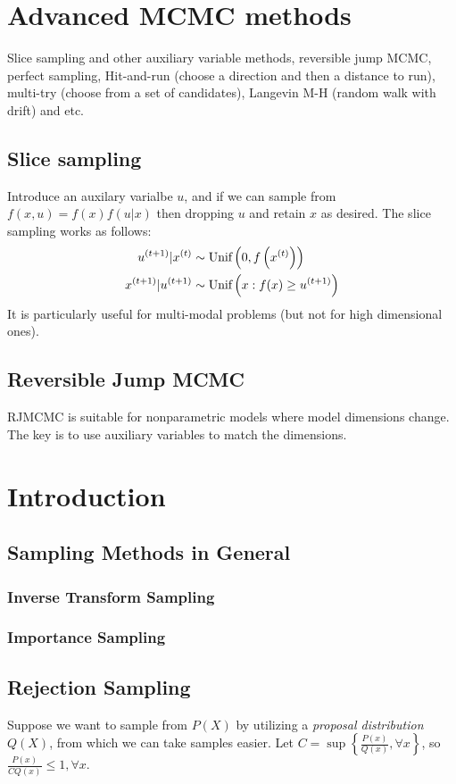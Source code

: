 \section{Advanced MCMC methods}
Slice sampling and other auxiliary variable methods, reversible jump MCMC, perfect sampling, Hit-and-run (choose a direction and then a distance to run), multi-try (choose from a set of candidates), Langevin M-H (random walk with drift) and etc.

\subsection{Slice sampling}
Introduce an auxilary varialbe $u$, and if we can sample from $f(x,u) = f(x)f(u|x)$ then dropping $u$ and retain $x$ as desired. The slice sampling works as follows:
\begin{align}
{u}^{(t+1)} | {x}^{(t)} &\sim \text{Unif}\left(0, f\left({x}^{(t)}\right)\right)\\
{x}^{(t+1)} | {u}^{(t+1)} &\sim \text{Unif}\left(x: f(x) \ge {u}^{(t+1)}\right)
\end{align}
It is particularly useful for multi-modal problems (but not for high dimensional ones).

\subsection{Reversible Jump MCMC}
RJMCMC is suitable for nonparametric models where model dimensions change. The key is to use auxiliary variables to match the dimensions.

\section{Introduction}
\subsection{Sampling Methods in General}
\subsubsection{Inverse Transform Sampling}
\subsubsection{Importance Sampling}
\subsection{Rejection Sampling}
Suppose we want to sample from $P(X)$ by utilizing a {\em{proposal distribution}} $Q(X)$, from which we can take samples easier. Let $C = \sup \left\{\frac{P(x)}{Q(x)}, \forall x\right\}$, so $\frac{P(x)}{CQ(x)} \le 1, \forall x$.

